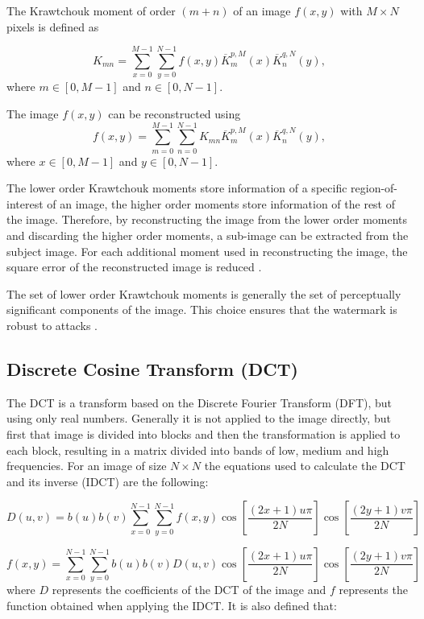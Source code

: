 \documentclass[runningheads]{llncs}
\begin{document}
The Krawtchouk moment of order $(m+n)$ of an image $f(x,y)$ with $M\times N$ pixels is defined as

\begin{equation}
K_{mn}=\sum_{x=0}^{M-1}\sum_{y=0}^{N-1}f(x,y)\overline{K}_{m}^{p,M}(x)\overline{K}_{n}^{q,N}(y),
\label{DKT}
\end{equation}
where $m\in \left[ 0,M-1\right] $ and $n\in \left[ 0,N-1\right] $.

The image $f(x,y)$ can be reconstructed using
\begin{equation}
f(x,y)=\sum_{m=0}^{M-1}\sum_{n=0}^{N-1}K_{mn}\overline{K}_{m}^{p,M}(x)\overline{K}_{n}^{q,N}(y),
\label{IDKT}
\end{equation}
where $x\in \left[ 0,M-1\right] $ and $y\in \left[ 0,N-1\right] $.

The lower order Krawtchouk moments store information of a specific region-of-interest of an image, the higher order moments store information of the rest of the image. Therefore, by reconstructing the image from the lower order moments and discarding the higher order moments, a sub-image can be extracted from the subject image. For each additional moment used in reconstructing the image, the square error of the reconstructed image is reduced \cite{Yap2003}.

The set of lower order Krawtchouk moments is generally the set of perceptually significant components of the image. This choice ensures that the watermark is robust to attacks \cite{Yap2004}.

\subsection{Discrete Cosine Transform (DCT)}
The DCT \cite{ahmed1974discrete} is a transform based on the Discrete Fourier Transform (DFT), but using only real numbers. Generally it is not applied to the image directly, but first that image is divided into blocks and then the transformation is applied to each block, resulting in a matrix divided into bands of low, medium and high frequencies. For an image of size $N\times N$ the equations used to calculate the DCT and its inverse (IDCT) are the following: 

\begin{equation}
D(u,v)=b(u)b(v)\sum_{x=0}^{N-1}\sum_{y=0}^{N-1}f(x,y)\cos\left[\frac{\left(2x+1\right)u\pi}{2N}\right]\cos\left[\frac{\left(2y+1\right)v\pi}{2N}\right]
\end{equation}

\begin{equation}
f(x,y)=\sum_{x=0}^{N-1}\sum_{y=0}^{N-1}b(u)b(v)D(u,v)\cos\left[\frac{\left(2x+1\right)u\pi}{2N}\right]\cos\left[\frac{\left(2y+1\right)v\pi}{2N}\right]
\end{equation}
where $D$ represents the coefficients of the DCT of the image and $f$ represents the function obtained when applying the IDCT. It is also defined that: 
\end{document}
